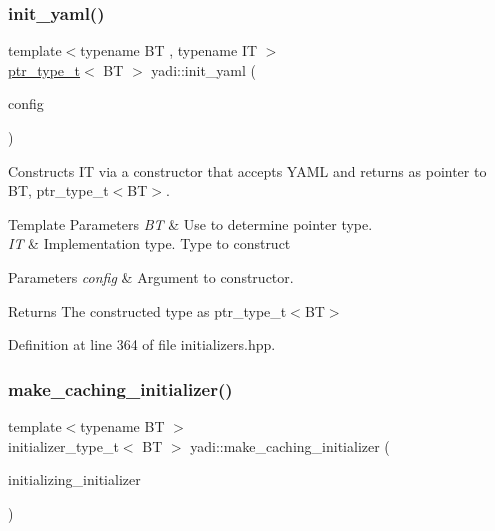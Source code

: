 \subsubsection{\texorpdfstring{init\+\_\+yaml()}{init\_yaml()}}
{\footnotesize\ttfamily template$<$typename BT , typename IT $>$ \\
\hyperlink{namespaceyadi_a92290eb27cd90666aa87b17d854af9fe}{ptr\+\_\+type\+\_\+t}$<$ BT $>$ yadi\+::init\+\_\+yaml (\begin{DoxyParamCaption}\item[{Y\+A\+M\+L\+::\+Node const \&}]{config }\end{DoxyParamCaption})}



Constructs IT via a constructor that accepts Y\+A\+ML and returns as pointer to BT, ptr\+\_\+type\+\_\+t$<$\+B\+T$>$. 


\begin{DoxyTemplParams}{Template Parameters}
{\em BT} & Use to determine pointer type. \\
\hline
{\em IT} & Implementation type. Type to construct \\
\hline
\end{DoxyTemplParams}

\begin{DoxyParams}{Parameters}
{\em config} & Argument to constructor. \\
\hline
\end{DoxyParams}
\begin{DoxyReturn}{Returns}
The constructed type as ptr\+\_\+type\+\_\+t$<$\+B\+T$>$ 
\end{DoxyReturn}


Definition at line 364 of file initializers.\+hpp.

\mbox{\label{namespaceyadi_a97efcea8efe1e35d98961c88e21d5b31}} 
\subsubsection{\texorpdfstring{make\+\_\+caching\+\_\+initializer()}{make\_caching\_initializer()}\hspace{0.1cm}{\footnotesize\ttfamily [1/2]}}
{\footnotesize\ttfamily template$<$typename BT $>$ \\
initializer\+\_\+type\+\_\+t$<$ BT $>$ yadi\+::make\+\_\+caching\+\_\+initializer (\begin{DoxyParamCaption}\item[{initializer\+\_\+type\+\_\+t$<$ BT $>$ const \&}]{initializing\+\_\+initializer }\end{DoxyParamCaption})}




